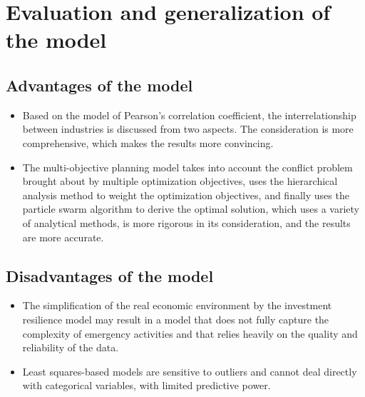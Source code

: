 \documentclass[12pt]{article}  %
\begin{document}
	 
\section{Evaluation and generalization of the model}
\subsection{Advantages of the model}
	\begin{itemize}  %
		\item Based on the model of Pearson's correlation coefficient, the interrelationship between industries is discussed from two aspects. The consideration is more comprehensive, which makes the results more convincing.
		\item The multi-objective planning model takes into account the conflict problem brought about by multiple optimization objectives, uses the hierarchical analysis method to weight the optimization objectives, and finally uses the particle swarm algorithm to derive the optimal solution, which uses a variety of analytical methods, is more rigorous in its consideration, and the results are more accurate.
	\end{itemize}

\subsection{Disadvantages of the model}
	\begin{itemize}  %
		\item The simplification of the real economic environment by the investment resilience model may result in a model that does not fully capture the complexity of emergency activities and that relies heavily on the quality and reliability of the data.
		\item Least squares-based models are sensitive to outliers and cannot deal directly with categorical variables, with limited predictive power.
	\end{itemize}

	 
	 
	 
	 
	 
	 
	 
	 
	
\end{document}
